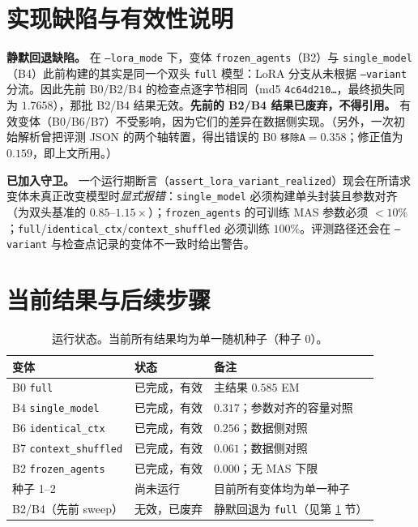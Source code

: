 \documentclass[10pt]{article}
\begin{document}
\section{实现缺陷与有效性说明}\label{sec:bug}
\textbf{静默回退缺陷。} 在 \texttt{--lora\_mode} 下，变体 \texttt{frozen\_agents}（B2）与 \texttt{single\_model}（B4）此前构建的其实是同一个双头 \texttt{full} 模型：LoRA 分支从未根据 \texttt{--variant} 分流。因此先前 B0/B2/B4 的检查点逐字节相同（md5 \texttt{4c64d210\ldots}，最终损失同为 $1.7658$），那批 B2/B4 结果无效。\textbf{先前的 B2/B4 结果已废弃，不得引用。} 有效变体（B0/B6/B7）不受影响，因为它们的差异在数据侧实现。（另外，一次初始解析曾把评测 JSON 的两个轴转置，得出错误的 B0 \texttt{移除A}$=0.358$；修正值为 $0.159$，即上文所用。）

\noindent\textbf{已加入守卫。} 一个运行期断言（\texttt{assert\_lora\_variant\_realized}）现会在所请求变体未真正改变模型时\emph{显式报错}：\texttt{single\_model} 必须构建单头封装且参数对齐（为双头基准的 $0.85$--$1.15\times$）；\texttt{frozen\_agents} 的可训练 MAS 参数必须 $<10\%$；\texttt{full}/\texttt{identical\_ctx}/\texttt{context\_shuffled} 必须训练 $100\%$。评测路径还会在 \texttt{--variant} 与检查点记录的变体不一致时给出警告。

\section{当前结果与后续步骤}\label{sec:status}
\begin{table}[H]
\centering
\small
\begin{tabular}{@{}l l l@{}}
\toprule
\textbf{变体} & \textbf{状态} & \textbf{备注} \\
\midrule
B0 \texttt{full}              & 已完成，有效   & 主结果 $0.585$ EM \\
B4 \texttt{single\_model}     & 已完成，有效   & $0.317$；参数对齐的容量对照 \\
B6 \texttt{identical\_ctx}    & 已完成，有效   & $0.256$；数据侧对照 \\
B7 \texttt{context\_shuffled} & 已完成，有效   & $0.061$；数据侧对照 \\
B2 \texttt{frozen\_agents}    & 已完成，有效   & $0.000$；无 MAS 下限 \\
种子 1--2                     & 尚未运行       & 目前所有变体均为单一种子 \\
\midrule
B2/B4（先前 sweep）           & 无效，已废弃   & 静默回退为 \texttt{full}（见第 \ref{sec:bug} 节） \\
\bottomrule
\end{tabular}
\caption{运行状态。当前所有结果均为单一随机种子（种子 0）。}
\end{table}
\end{document}
